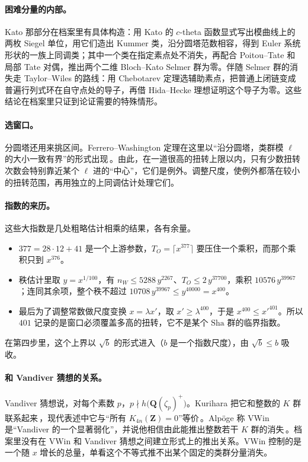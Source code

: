\documentclass[11pt]{article}
\newcommand{\Q}{\mathbf{Q}}
\newcommand{\Z}{\mathbf{Z}}
\newcommand{\Sha}{\mathrm{Sha}}
\begin{document}
\paragraph{困难分量的内部。} Kato 那部分在档案里有具体构造：用 Kato 的 $c$-theta 函数显式写出模曲线上的两枚 Siegel 单位，用它们造出 Kummer 类，沿分圆塔范数相容，得到 Euler 系统形状的一族上同调类；其中一个类在指定素点处不消失，再配合 Poitou–Tate 和局部 Tate 对偶，推出两个二维 Bloch–Kato Selmer 群为零。伴随 Selmer 群的消失走 Taylor–Wiles 的路线：用 Chebotarev 定理选辅助素点，把普通上闭链变成普遍行列式环在自守点处的导子，再借 Hida–Hecke 理想证明这个导子为零。这些结论在档案里只证到论证需要的特殊情形。

\paragraph{选窗口。} 分圆塔还用来挑区间。Ferrero–Washington 定理在这里以“沿分圆塔，类群模 $\ell$ 的大小一致有界”的形式出现\,\cite{fw}。由此，在一道很高的扭转上限以内，只有少数扭转次数会特别靠近某个 $\ell$ 进的“中心”，它们是例外。调整尺度，使例外都落在较小的扭转范围，再用独立的上同调估计处理它们。

\paragraph{指数的来历。} 这些大指数是几处粗略估计相乘的结果，各有余量。
\begin{itemize}
\item $377=28\cdot12+41$ 是一个上游参数，$T_O=\lceil x^{377}\rceil$ 要压住一个乘积，而那个乘积只到 $x^{376}$。
\item 秩估计里取 $y=x^{1/100}$，有 $n_W\le5288\,y^{2267}$、$T_O\le2\,y^{37700}$，乘积 $10576\,y^{39967}$；连同其余项，整个秩不超过 $10708\,y^{39967}\le y^{40000}=x^{400}$。
\item 最后为了调整常数做尺度变换 $x=\lambda x'$，取 $x'\ge\lambda^{400}$，于是 $x^{400}\le x'^{401}$。所以 $401$ 记录的是窗口必须覆盖多高的扭转，它不是某个 $\Sha$ 群的临界指数。
\end{itemize}
在第四步里，这个上界以 $\sqrt b$ 的形式进入（$b$ 是一个指数尺度），由 $\sqrt b\le b$ 吸收。

\paragraph{和 Vandiver 猜想的关系。} Vandiver 猜想说，对每个素数 $p$，$p\nmid h\bigl(\Q(\zeta_p)^+\bigr)$。Kurihara 把它和整数的 $K$ 群联系起来\,\cite{kurihara}，现代表述中它与“所有 $K_{4n}(\Z)=0$”等价\,\cite{weibel}。Alpöge 称 \textsf{VWin} 是“Vandiver 的一个显著弱化”，并说他相信由此能推出整数若干 $K$ 群的消失\,\cite{alpoge}。档案里没有在 \textsf{VWin} 和 Vandiver 猜想之间建立形式上的推出关系。\textsf{VWin} 控制的是一个随 $x$ 增长的总量，单看这个不等式推不出某个固定的类群分量消失。
\end{document}
